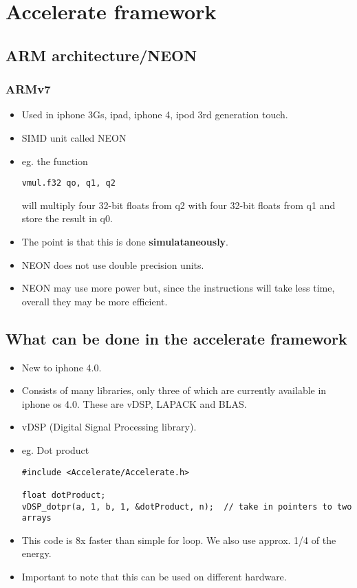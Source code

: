 \chapter{Accelerate framework}

\section{ARM architecture/NEON}

\subsection{ARMv7}
\begin{itemize}
\item Used in iphone 3Gs, ipad, iphone 4, ipod 3rd generation touch. 
\item SIMD unit called NEON
\item eg. the function 
\begin{verbatim}
vmul.f32 qo, q1, q2
\end{verbatim}
will multiply four 32-bit floats from q2 with four 32-bit floats from q1 and store the result in q0.
\item The point is that this is done {\bf simulataneously}.
\item NEON does not use double precision units.
\item NEON may use more power but, since the instructions will take less time, overall they may be more efficient.
\end{itemize}

\section{What can be done in the accelerate framework}

\begin{itemize}
\item New to iphone 4.0.
\item Consists of many libraries, only three of which are currently available in iphone os 4.0. These are vDSP, LAPACK and BLAS.
\item vDSP (Digital Signal Processing library). 
\item eg. Dot product
\begin{verbatim}
#include <Accelerate/Accelerate.h>

float dotProduct;
vDSP_dotpr(a, 1, b, 1, &dotProduct, n);  // take in pointers to two arrays 
\end{verbatim}
\item This code is 8x faster than simple for loop. We also use approx. 1/4 of the energy.
\item Important to note that this can be used on different hardware.
\end{itemize}

